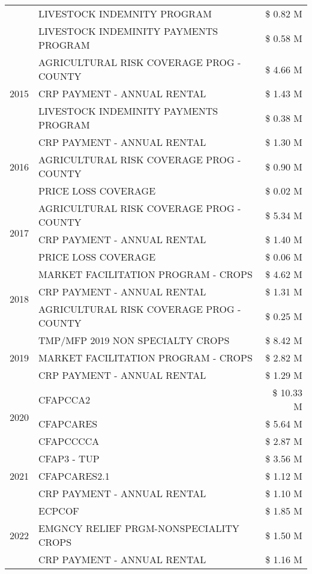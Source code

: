 \begin{tabular}{llr}
 & LIVESTOCK INDEMNITY PROGRAM & \$ 0.82 M \\
 & LIVESTOCK INDEMINITY PAYMENTS PROGRAM & \$ 0.58 M \\
\cline{1-3}
\multirow[t]{3}{*}{2015} & AGRICULTURAL RISK COVERAGE PROG - COUNTY & \$ 4.66 M \\
 & CRP PAYMENT - ANNUAL RENTAL & \$ 1.43 M \\
 & LIVESTOCK INDEMINITY PAYMENTS PROGRAM & \$ 0.38 M \\
\cline{1-3}
\multirow[t]{3}{*}{2016} & CRP PAYMENT - ANNUAL RENTAL & \$ 1.30 M \\
 & AGRICULTURAL RISK COVERAGE PROG - COUNTY & \$ 0.90 M \\
 & PRICE LOSS COVERAGE & \$ 0.02 M \\
\cline{1-3}
\multirow[t]{3}{*}{2017} & AGRICULTURAL RISK COVERAGE PROG - COUNTY & \$ 5.34 M \\
 & CRP PAYMENT - ANNUAL RENTAL & \$ 1.40 M \\
 & PRICE LOSS COVERAGE & \$ 0.06 M \\
\cline{1-3}
\multirow[t]{3}{*}{2018} & MARKET FACILITATION PROGRAM - CROPS & \$ 4.62 M \\
 & CRP PAYMENT - ANNUAL RENTAL & \$ 1.31 M \\
 & AGRICULTURAL RISK COVERAGE PROG - COUNTY & \$ 0.25 M \\
\cline{1-3}
\multirow[t]{3}{*}{2019} & TMP/MFP 2019 NON SPECIALTY CROPS & \$ 8.42 M \\
 & MARKET FACILITATION PROGRAM - CROPS & \$ 2.82 M \\
 & CRP PAYMENT - ANNUAL RENTAL & \$ 1.29 M \\
\cline{1-3}
\multirow[t]{3}{*}{2020} & CFAPCCA2 & \$ 10.33 M \\
 & CFAPCARES & \$ 5.64 M \\
 & CFAPCCCCA & \$ 2.87 M \\
\cline{1-3}
\multirow[t]{3}{*}{2021} & CFAP3 - TUP & \$ 3.56 M \\
 & CFAPCARES2.1 & \$ 1.12 M \\
 & CRP PAYMENT - ANNUAL RENTAL & \$ 1.10 M \\
\cline{1-3}
\multirow[t]{3}{*}{2022} & ECPCOF & \$ 1.85 M \\
 & EMGNCY RELIEF PRGM-NONSPECIALITY CROPS & \$ 1.50 M \\
 & CRP PAYMENT - ANNUAL RENTAL & \$ 1.16 M \\
\cline{1-3}
\bottomrule
\end{tabular}
